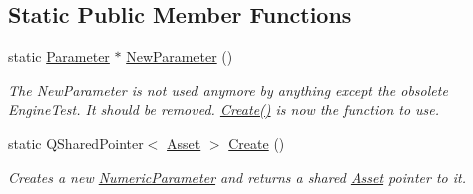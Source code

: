 \subsection*{Static Public Member Functions}
\begin{DoxyCompactItemize}
\item 
\hypertarget{class_picto_1_1_numeric_parameter_ad58f002914d7334482de076521918778}{static \hyperlink{class_picto_1_1_parameter}{Parameter} $\ast$ \hyperlink{class_picto_1_1_numeric_parameter_ad58f002914d7334482de076521918778}{New\-Parameter} ()}\label{class_picto_1_1_numeric_parameter_ad58f002914d7334482de076521918778}

\begin{DoxyCompactList}\small\item\em The New\-Parameter is not used anymore by anything except the obsolete Engine\-Test. It should be removed. \hyperlink{class_picto_1_1_numeric_parameter_aee6239b4696ae113d24f87fc9ac0bcac}{Create()} is now the function to use. \end{DoxyCompactList}\item 
\hypertarget{class_picto_1_1_numeric_parameter_aee6239b4696ae113d24f87fc9ac0bcac}{static Q\-Shared\-Pointer$<$ \hyperlink{class_picto_1_1_asset}{Asset} $>$ \hyperlink{class_picto_1_1_numeric_parameter_aee6239b4696ae113d24f87fc9ac0bcac}{Create} ()}\label{class_picto_1_1_numeric_parameter_aee6239b4696ae113d24f87fc9ac0bcac}

\begin{DoxyCompactList}\small\item\em Creates a new \hyperlink{class_picto_1_1_numeric_parameter}{Numeric\-Parameter} and returns a shared \hyperlink{class_picto_1_1_asset}{Asset} pointer to it. \end{DoxyCompactList}\end{DoxyCompactItemize}
